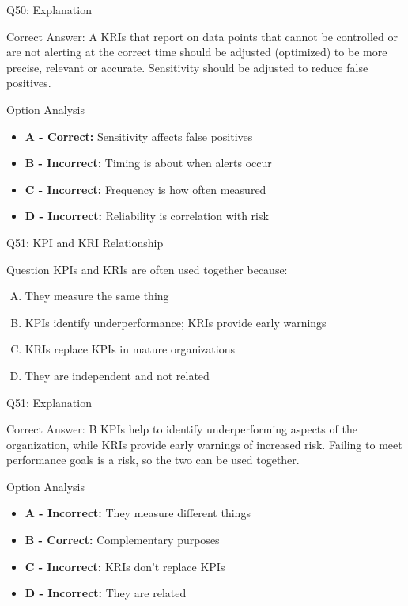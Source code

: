 \documentclass{beamer}
\begin{document}
	\begin{frame}{Q50: Explanation}
		\begin{block}{Correct Answer: A}
			KRIs that report on data points that cannot be controlled or are not alerting at the correct time should be adjusted (optimized) to be more precise, relevant or accurate. Sensitivity should be adjusted to reduce false positives.
		\end{block}
		\begin{block}{Option Analysis}
			\begin{itemize}
				\item \textbf{A - Correct:} Sensitivity affects false positives
				\item \textbf{B - Incorrect:} Timing is about when alerts occur
				\item \textbf{C - Incorrect:} Frequency is how often measured
				\item \textbf{D - Incorrect:} Reliability is correlation with risk
			\end{itemize}
		\end{block}
	\end{frame}
	
	\begin{frame}{Q51: KPI and KRI Relationship}
		\begin{block}{Question}
			KPIs and KRIs are often used together because:
		\end{block}
		\begin{enumerate}[(A)]
			\item They measure the same thing
			\item KPIs identify underperformance; KRIs provide early warnings
			\item KRIs replace KPIs in mature organizations
			\item They are independent and not related
		\end{enumerate}
	\end{frame}
	
	\begin{frame}{Q51: Explanation}
		\begin{block}{Correct Answer: B}
			KPIs help to identify underperforming aspects of the organization, while KRIs provide early warnings of increased risk. Failing to meet performance goals is a risk, so the two can be used together.
		\end{block}
		\begin{block}{Option Analysis}
			\begin{itemize}
				\item \textbf{A - Incorrect:} They measure different things
				\item \textbf{B - Correct:} Complementary purposes
				\item \textbf{C - Incorrect:} KRIs don't replace KPIs
				\item \textbf{D - Incorrect:} They are related
			\end{itemize}
		\end{block}
	\end{frame}
	
\end{document}
